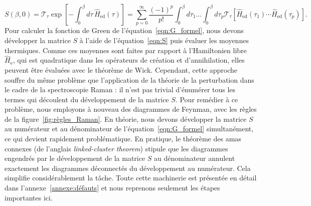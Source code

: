 \begin{equation}
    S(\beta, 0) = \mathcal{T}_\tau\exp[-\int_0^\beta d\tau\,\hat{H}_\text{ed}(\tau)] = \sum_{p=0}^\infty\frac{(-1)^p}{p!}\int_0^\beta d\tau_1\dots\int_0^\beta d\tau_p\mathcal{T}_\tau\left[\hat{H}_\text{ed}(\tau_1)\cdots\hat{H}_\text{ed}(\tau_p)\right].\label{eqn:S}
\end{equation}
Pour calculer la fonction de Green de l'équation~\eqref{eqn:G_formel}, nous devons développer la matrice $S$ à l'aide de l'équation~\eqref{eqn:S} puis évaluer les moyennes thermiques. Comme ces moyennes sont faites par rapport à l'Hamiltonien libre $\hat{H}_\text{e}$, qui est quadratique dans les opérateurs de création et d'annihilation, elles peuvent être évaluées avec le théorème de Wick. Cependant, cette approche souffre du même problème que l'application de la théorie de la perturbation dans le cadre de la spectroscopie Raman : il n'est pas trivial d'énumérer tous les termes qui découlent du développement de la matrice $S$. Pour remédier à ce problème, nous employons à nouveau des diagrammes de Feynman, avec les règles de la figure~\ref{fig:règles_Raman}. En théorie, nous devons développer la matrice $S$ au numérateur et au dénominateur de l'équation~\eqref{eqn:G_formel} simultanément, ce qui devient rapidement problématique. En pratique, le théorème des amas connexes (de l'anglais \textit{linked-cluster theorem}) stipule que les diagrammes engendrés par le développement de la matrice $S$ au dénominateur annulent exactement les diagrammes déconnectés du développement au numérateur. Cela simplifie considérablement la tâche. Toute cette machinerie est présentée en détail dans l'annexe~\ref{annexe:défauts} et nous reprenons seulement les étapes importantes ici.


